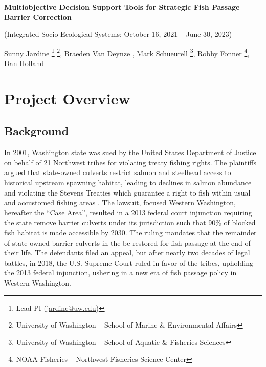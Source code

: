 \documentclass[12pt]{elsarticle}
\begin{document}
	
\begin{center}
		\textbf{Multiobjective Decision Support Tools for Strategic Fish Passage Barrier Correction}
		
		(Integrated Socio-Ecological Systems; October 16, 2021 -- June 30, 2023)

		\vspace{0.1cm}
		Sunny Jardine \footnote{Lead PI (\url{jardine@uw.edu})} \footnote{University of Washington -- School of Marine \& Environmental Affairs}, Braeden Van Deynze \footnotemark[2], Mark Schueurell \footnote{University of Washington -- School of Aquatic \& Fisheries Sciences}, Robby Fonner \footnote{NOAA Fisheries -- Northwest Fisheries Science Center}, Dan Holland \footnotemark[4]
\end{center}

	
	\section{Project Overview}
	\subsection{Background} 

In 2001, Washington state was sued by the United States Department of Justice on behalf of 21 Northwest tribes for violating treaty fishing rights. The plaintiffs argued that state-owned culverts restrict salmon and steelhead access to historical upstream spawning habitat, leading to declines in salmon abundance and violating the Stevens Treaties which guarantee a right to fish within usual and accustomed fishing areas \citep{hickey_highway_2018}. The lawsuit, focused Western Washington, hereafter the ``Case Area'', resulted in a 2013 federal court injunction requiring the state remove barrier culverts under its jurisdiction such that 90\% of blocked fish habitat is made accessible by 2030. The ruling mandates that the remainder of state-owned barrier culverts in the be restored for fish passage at the end of their life. The defendants filed an appeal, but after nearly two decades of legal battles, in 2018, the U.S. Supreme Court ruled in favor of the tribes, upholding the 2013 federal injunction, ushering in a new era of fish passage policy in Western Washington. 
	
\end{document}
